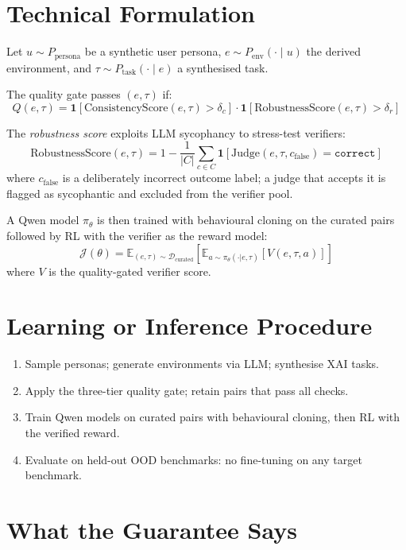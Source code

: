 \documentclass[10pt,twocolumn]{article}
\begin{document}
\section{Technical Formulation}

Let $u \sim P_{\text{persona}}$ be a synthetic user persona,
$e \sim P_{\text{env}}(\cdot \mid u)$ the derived environment, and
$\tau \sim P_{\text{task}}(\cdot \mid e)$ a synthesised task.

The quality gate passes $(e, \tau)$ if:
\[
Q(e, \tau) = \mathbf{1}\!\left[\text{ConsistencyScore}(e, \tau) > \delta_c\right]
  \cdot \mathbf{1}\!\left[\text{RobustnessScore}(e, \tau) > \delta_r\right]
\]

The \textit{robustness score} exploits LLM sycophancy to stress-test verifiers:
\[
\text{RobustnessScore}(e, \tau)
  = 1 - \frac{1}{|C|}\sum_{c \in C} \mathbf{1}\!\left[
    \text{Judge}(e, \tau, c_{\text{false}}) = \texttt{correct}\right]
\]
where $c_{\text{false}}$ is a deliberately incorrect outcome label; a
judge that accepts it is flagged as sycophantic and excluded from the
verifier pool.

A Qwen model $\pi_\theta$ is then trained with behavioural cloning on
the curated pairs followed by RL with the verifier as the reward model:
\[
\mathcal{J}(\theta) = \mathbb{E}_{(e,\tau)\sim\mathcal{D}_{\text{curated}}}
  \!\left[\mathbb{E}_{a\sim\pi_\theta(\cdot|e,\tau)}\!\left[
    V(e, \tau, a)\right]\right]
\]
where $V$ is the quality-gated verifier score.

\section{Learning or Inference Procedure}

\begin{enumerate}[itemsep=2pt,parsep=0pt]
  \item Sample personas; generate environments via LLM; synthesise XAI tasks.
  \item Apply the three-tier quality gate; retain pairs that pass all checks.
  \item Train Qwen models on curated pairs with behavioural cloning, then
    RL with the verified reward.
  \item Evaluate on held-out OOD benchmarks: no fine-tuning on any target
    benchmark.
\end{enumerate}

\section{What the Guarantee Says}
\end{document}
